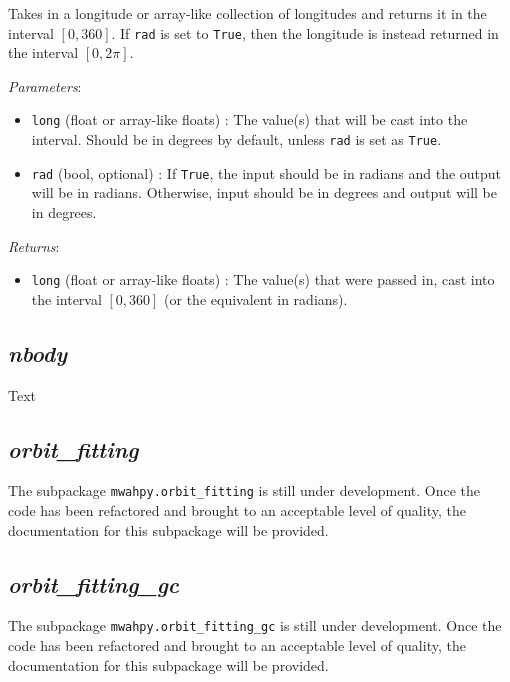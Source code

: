\documentclass{article}
\begin{document}
\begin{itemize}
Takes in a longitude or array-like collection of longitudes and returns it in the interval $[0, 360]$. If \verb!rad! is set to \verb!True!, then the longitude is instead returned in the interval $[0, 2\pi]$. 

\textit{Parameters}: \begin{itemize}

\item \verb!long! (float or array-like floats) : The value(s) that will be cast into the interval. Should be in degrees by default, unless \verb!rad! is set as \verb!True!.

\item \verb!rad! (bool, optional) : If \verb!True!, the input should be in radians and the output will be in radians. Otherwise, input should be in degrees and output will be in degrees.

\end{itemize}

\textit{Returns}: \begin{itemize}

\item \verb!long! (float or array-like floats) : The value(s) that were passed in, cast into the interval $[0,360]$ (or the equivalent in radians).

\end{itemize}




\end{itemize}

\subsection{\textit{nbody}}

Text

\subsection{\textit{orbit\_fitting}}

The subpackage \verb!mwahpy.orbit_fitting! is still under development. Once the code has been refactored and brought to an acceptable level of quality, the documentation for this subpackage will be provided. 

\subsection{\textit{orbit\_fitting\_gc}}

The subpackage \verb!mwahpy.orbit_fitting_gc! is still under development. Once the code has been refactored and brought to an acceptable level of quality, the documentation for this subpackage will be provided.  
\end{document}
